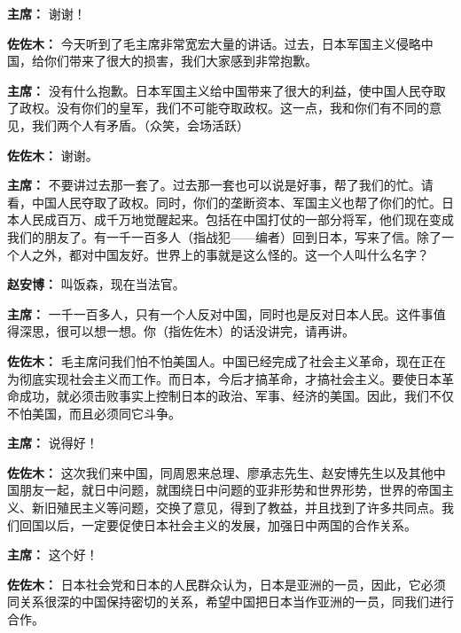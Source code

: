 \begin{list}{}
\item[\textbf{主席：}] 谢谢！

\item[\textbf{佐佐木：}] 今天听到了毛主席非常宽宏大量的讲话。过去，日本军国主义侵略中国，给你们带来了很大的损害，我们大家感到非常抱歉。

\item[\textbf{主席：}] 没有什么抱歉。日本军国主义给中国带来了很大的利益，使中国人民夺取了政权。没有你们的皇军，我们不可能夺取政权。这一点，我和你们有不同的意见，我们两个人有矛盾。（众笑，会场活跃）

\item[\textbf{佐佐木：}] 谢谢。

\item[\textbf{主席：}] 不要讲过去那一套了。过去那一套也可以说是好事，帮了我们的忙。请看，中国人民夺取了政权。同时，你们的垄断资本、军国主义也帮了你们的忙。日本人民成百万、成千万地觉醒起来。包括在中国打仗的一部分将军，他们现在变成我们的朋友了。有一千一百多人（指战犯——编者）回到日本，写来了信。除了一个人之外，都对中国友好。世界上的事就是这么怪的。这一个人叫什么名字？

\item[\textbf{赵安博：}] 叫饭森，现在当法官。

\item[\textbf{主席：}] 一千一百多人，只有一个人反对中国，同时也是反对日本人民。这件事值得深思，很可以想一想。你（指佐佐木）的话没讲完，请再讲。

\item[\textbf{佐佐木：}] 毛主席问我们怕不怕美国人。中国已经完成了社会主义革命，现在正在为彻底实现社会主义而工作。而日本，今后才搞革命，才搞社会主义。要使日本革命成功，就必须击败事实上控制日本的政治、军事、经济的美国。因此，我们不仅不怕美国，而且必须同它斗争。

\item[\textbf{主席：}] 说得好！

\item[\textbf{佐佐木：}] 这次我们来中国，同周恩来总理、廖承志先生、赵安博先生以及其他中国朋友一起，就日中问题，就围绕日中问题的亚非形势和世界形势，世界的帝国主义、新旧殖民主义等问题，交换了意见，得到了教益，并且找到了许多共同点。我们回国以后，一定要促使日本社会主义的发展，加强日中两国的合作关系。

\item[\textbf{主席：}] 这个好！

\item[\textbf{佐佐木：}] 日本社会党和日本的人民群众认为，日本是亚洲的一员，因此，它必须同关系很深的中国保持密切的关系，希望中国把日本当作亚洲的一员，同我们进行合作。


\end{list}
